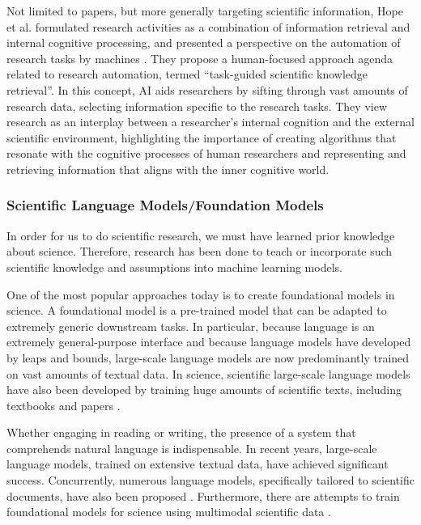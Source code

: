\documentclass{article}
\begin{document}
Not limited to papers, but more generally targeting scientific information, Hope et al. formulated research activities as a combination of information retrieval and internal cognitive processing, and presented a perspective on the automation of research tasks by machines \cite{hope2022computational}. They propose a human-focused approach agenda related to research automation, termed ``task-guided scientific knowledge retrieval''. In this concept, AI aids researchers by sifting through vast amounts of research data, selecting information specific to the research tasks. They view research as an interplay between a researcher's internal cognition and the external scientific environment, highlighting the importance of creating algorithms that resonate with the cognitive processes of human researchers and representing and retrieving information that aligns with the inner cognitive world.

\subsubsection{Scientific Language Models/Foundation Models}
In order for us to do scientific research, we must have learned prior knowledge about science. Therefore, research has been done to teach or incorporate such scientific knowledge and assumptions into machine learning models.

One of the most popular approaches today is to create foundational models in science. A foundational model is a pre-trained model that can be adapted to extremely generic downstream tasks. In particular, because language is an extremely general-purpose interface and because language models have developed by leaps and bounds, large-scale language models are now predominantly trained on vast amounts of textual data. In science, scientific large-scale language models have also been developed by training huge amounts of scientific texts, including textbooks and papers \cite{taylor2022galactica}.


Whether engaging in reading or writing, the presence of a system that comprehends natural language is indispensable. In recent years, large-scale language models, trained on extensive textual data, have achieved significant success. Concurrently, numerous language models, specifically tailored to scientific documents, have also been proposed \cite{beltagy2019scibert,singh2022scirepeval,nadkarni2021scientific,cohan2020specter,gupta2022matscibert,taylor2022galactica,azerbayev2023llemma}. Furthermore, there are attempts to train foundational models for science using multimodal scientific data \cite{singhal2023towards,takeda2023foundation,nguyen2023climax}.
\end{document}
